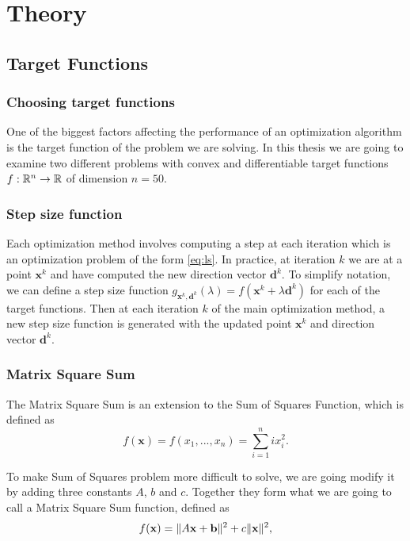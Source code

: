 \documentclass[a4paper,english,titlepage,12pt]{article}
\newcommand{\vect}[1]{\ensuremath{\mathbf{#1}}}
\newcommand{\norm}[1]{\ensuremath\Vert #1 \Vert}
\newcommand{\R}{\ensuremath\mathbb{R}}
\begin{document}
\section{Theory}


\subsection{Target Functions}


\subsubsection{Choosing target functions}


One of the biggest factors affecting the performance of an optimization algorithm is the target function of the problem we are solving. 
In this thesis we are going to examine two different problems with convex and differentiable target functions $f : \R^n \rightarrow \R$ of dimension $n = 50$. 

\subsubsection{Step size function}

Each optimization method involves computing a step at each iteration which is an optimization problem of the form \eqref{eq:ls}. In practice, at iteration $k$ we are at a point $\vect{x}^k$ and have computed the new direction vector $\vect{d}^k$. To simplify notation, we can define a step size function $g_{\vect{x}^k, \vect{d}^k}(\lambda) = f(\vect{x}^k + \lambda \vect{d}^k)$ for each of the target functions. Then at each iteration $k$ of the main optimization method, a new step size function is generated with the updated point $\vect{x}^k$ and direction vector $\vect{d}^k$.

\subsubsection{Matrix Square Sum}
\label{sect:matrix_square_sum}

The Matrix Square Sum is an extension to the Sum of Squares Function, which is defined as
\begin{equation}
    f(\mathbf{x})=f(x_1, ..., x_n)=\sum_{i=1}^{n}{ix_i^2}.
\end{equation}

To make Sum of Squares problem more difficult to solve, we are going modify it by adding three constants $A$, $b$ and $c$. Together they form what we are going to call a Matrix Square Sum function, defined as
\begin{equation}
    f(\vect{x}) = \norm{A \vect{x} + \vect{b}} ^ 2 + c \norm{\vect{x}} ^ 2,
\end{equation}
\end{document}
